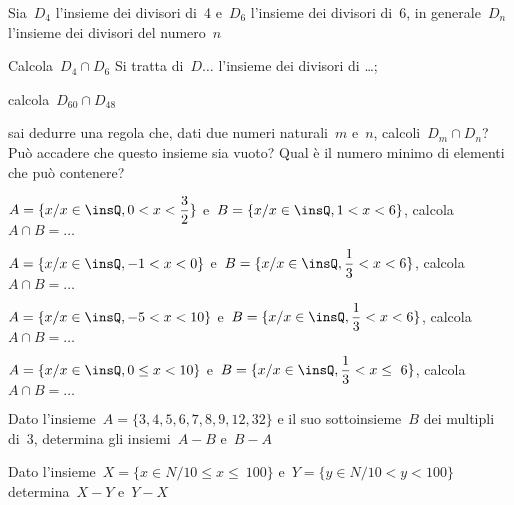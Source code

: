 \begin{esercizio}
\label{ese:7.47}
Sia~$D_{4}$ l'insieme dei divisori di~4 e~$D_{6}$ l'insieme dei divisori di~6, 
in generale~$D_{n}$ l'insieme dei divisori del numero~$n$
\vspace{-6pt}
\begin{enumeratea}
 \item Calcola~$D_{4}\cap D_{6}$ Si tratta di~$D\ldots$ l'insieme dei divisori 
di \ldots;
 \item calcola~$D_{60}\cap D_{48}$
 \item sai dedurre una regola che, dati due numeri naturali~$m$ e~$n$,
calcoli~$D_{m}\cap D_{n}$? Può accadere che questo insieme sia
vuoto? Qual è il numero minimo di elementi che può contenere?
\end{enumeratea}
\end{esercizio}

\begin{esercizio}
\label{ese:7.48}
$A=\{x/x\in \insQ,0<x<\dfrac{3}{2}\}$ e~$B=\{x/x\in \insQ,1<x<6\}$, 
calcola~$A\cap B=\ldots$
\end{esercizio}

\begin{esercizio}
\label{ese:7.49}
$A=\{x/x\in \insQ,-1<x<0\}$ e~$B=\{x/x\in \insQ,\dfrac{1}{3}<x<6\}$, 
calcola~$A\cap B=\ldots$
\end{esercizio}

\begin{esercizio}
\label{ese:7.50}
$A=\{x/x\in \insQ,-5<x<10\}$ e~$B=\{x/x\in \insQ,\dfrac{1}{3}<x<6\}$, 
calcola~$A\cap B=\ldots$
\end{esercizio}

\begin{esercizio}
\label{ese:7.51}
$A=\{x/x\in \insQ,0\le x<10\}$ e~$B=\{x/x\in \insQ,\dfrac{1}{3}<x\le~6\}$, 
calcola~$A\cap B=\ldots$
\end{esercizio}

\begin{esercizio}
\label{ese:7.52}
Dato l'insieme~$A=\{3, 4, 5, 6, 7, 8, 9, 12, 32\}$ e il suo sottoinsieme~$B$ dei 
multipli di~3, determina gli
insiemi~$A-B$ e~$B-A$
\end{esercizio}

\begin{esercizio}
\label{ese:7.53}
Dato l'insieme~$X=\{x\in N/10\le x\le~100\}$ e~$Y=\{y\in N/10<y<100\}$ 
determina~$X-Y$ e~$Y-X$
\end{esercizio}

